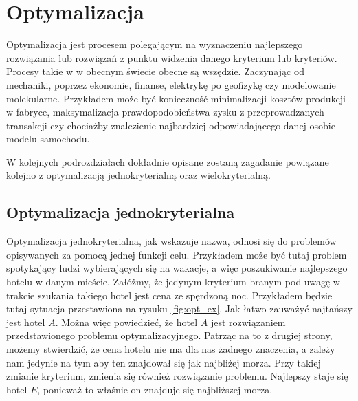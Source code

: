 \documentclass[twoside]{iisthesis}
\begin{document}
\chapter{Optymalizacja}
Optymalizacja jest procesem polegającym na wyznaczeniu najlepszego rozwiązania lub rozwiązań z punktu widzenia danego kryterium lub kryteriów. Procesy takie w w obecnym świecie obecne są wszędzie. Zaczynając od mechaniki, poprzez ekonomie, finanse, elektrykę po geofizykę czy modelowanie molekularne. Przykładem może być konieczność minimalizacji kosztów produkcji w fabryce, maksymalizacja prawdopodobieństwa zysku z przeprowadzanych transakcji czy chociażby znalezienie najbardziej odpowiadającego danej osobie modelu samochodu.

W kolejnych podrozdziałach dokładnie opisane zostaną zagadanie powiązane kolejno z optymalizacją jednokryterialną oraz wielokryterialną.
\section{Optymalizacja jednokryterialna}
Optymalizacja jednokryterialna, jak wskazuje nazwa, odnosi się do problemów opisywanych za pomocą jednej funkcji celu. Przykładem może być tutaj problem spotykający ludzi wybierających się na wakacje, a więc poszukiwanie najlepszego hotelu w danym mieście. Załóżmy, że jedynym kryterium branym pod uwagę w trakcie szukania takiego hotel jest cena ze spęrdzoną noc. Przykładem będzie tutaj sytuacja przestawiona na rysuku \eqref{fig:opt_ex}. Jak łatwo zauważyć najtańszy jest hotel $A$. Można więc powiedzieć, że hotel $A$ jest rozwiązaniem przedstawionego problemu optymalizacyjnego. Patrząc na to z drugiej strony, możemy stwierdzić, że cena hotelu nie ma dla nas żadnego znaczenia, a zależy nam jedynie na tym aby ten znajdował się jak najbliżej morza. Przy takiej zmianie kryterium, zmienia się również rozwiązanie problemu. Najlepszy staje się hotel $E$, ponieważ to właśnie on znajduje się najbliższej morza.
\end{document}
